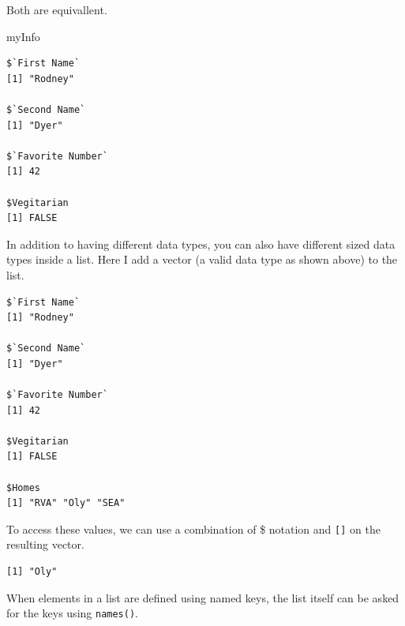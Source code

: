 \documentclass[
  letterpaper,
]{book}
\newenvironment{Shaded}{\begin{snugshade}}{\end{snugshade}}
\newcommand{\DecValTok}[1]{\textcolor[rgb]{0.68,0.00,0.00}{#1}}
\newcommand{\FunctionTok}[1]{\textcolor[rgb]{0.28,0.35,0.67}{#1}}
\newcommand{\NormalTok}[1]{\textcolor[rgb]{0.00,0.23,0.31}{#1}}
\newcommand{\OtherTok}[1]{\textcolor[rgb]{0.00,0.23,0.31}{#1}}
\newcommand{\SpecialCharTok}[1]{\textcolor[rgb]{0.37,0.37,0.37}{#1}}
\newcommand{\StringTok}[1]{\textcolor[rgb]{0.13,0.47,0.30}{#1}}
\begin{document}
Both are equivallent.

\begin{Shaded}
\begin{Highlighting}[]
\NormalTok{myInfo}
\end{Highlighting}
\end{Shaded}

\begin{verbatim}
$`First Name`
[1] "Rodney"

$`Second Name`
[1] "Dyer"

$`Favorite Number`
[1] 42

$Vegitarian
[1] FALSE
\end{verbatim}

In addition to having different data types, you can also have different
sized data types inside a list. Here I add a vector (a valid data type
as shown above) to the list.

\begin{Shaded}
\end{Shaded}

\begin{verbatim}
$`First Name`
[1] "Rodney"

$`Second Name`
[1] "Dyer"

$`Favorite Number`
[1] 42

$Vegitarian
[1] FALSE

$Homes
[1] "RVA" "Oly" "SEA"
\end{verbatim}

To access these values, we can use a combination of \$ notation and
\texttt{{[}{]}} on the resulting vector.

\begin{Shaded}
\end{Shaded}

\begin{verbatim}
[1] "Oly"
\end{verbatim}

When elements in a list are defined using named keys, the list itself
can be asked for the keys using \texttt{names()}.
\end{document}
